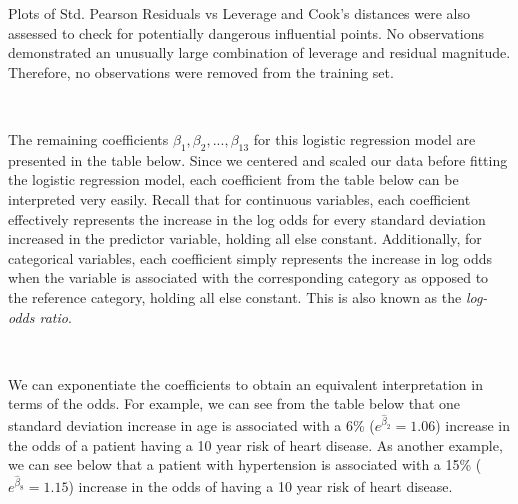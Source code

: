 \documentclass[10pt]{article}
\begin{document}
Plots of Std. Pearson Residuals vs Leverage and Cook's distances were also assessed to check for potentially dangerous influential points. No observations demonstrated an unusually large combination of leverage and residual magnitude. Therefore, no observations were removed from the training set.

\
 
The remaining coefficients $\beta_1, \beta_2, ..., \beta_{13}$ for this logistic regression model are presented in the table below. Since we centered and scaled our data before fitting the logistic regression model, each coefficient from the table below can be interpreted very easily. Recall that for continuous variables, each coefficient effectively represents the increase in the log odds for every standard deviation increased in the predictor variable, holding all else constant. Additionally, for categorical variables, each coefficient simply represents the increase in log odds when the variable is associated with the corresponding category as opposed to the reference category, holding all else constant. This is also known as the \textit{log-odds ratio}.

\

We can exponentiate the coefficients to obtain an equivalent interpretation in terms of the odds. For example, we can see from the table below that one standard deviation increase in age is associated with a 6\% ($e^{\hat{\beta}_{2}} = 1.06$) increase in the odds of a patient having a 10 year risk of heart disease. As another example, we can see below that a patient with hypertension is associated with a 15\% ($e^{\hat{\beta}_{8}} = 1.15$) increase in the odds of having a 10 year risk of heart disease.
\end{document}
